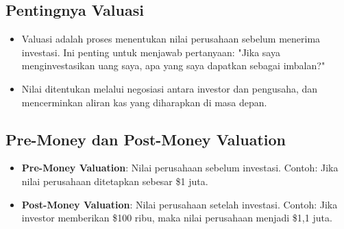 \documentclass{article}
\begin{document}
\subsection{Pentingnya Valuasi}
\begin{itemize}
    \item Valuasi adalah proses menentukan nilai perusahaan sebelum menerima investasi. Ini penting untuk menjawab pertanyaan: "Jika saya menginvestasikan uang saya, apa yang saya dapatkan sebagai imbalan?"
    \item Nilai ditentukan melalui negosiasi antara investor dan pengusaha, dan mencerminkan aliran kas yang diharapkan di masa depan.
\end{itemize}

\subsection{Pre-Money dan Post-Money Valuation}
\begin{itemize}
    \item \textbf{Pre-Money Valuation}: Nilai perusahaan sebelum investasi. Contoh: Jika nilai perusahaan ditetapkan sebesar \$1 juta.
    \item \textbf{Post-Money Valuation}: Nilai perusahaan setelah investasi. Contoh: Jika investor memberikan \$100 ribu, maka nilai perusahaan menjadi \$1,1 juta.
\end{itemize}
\end{document}
